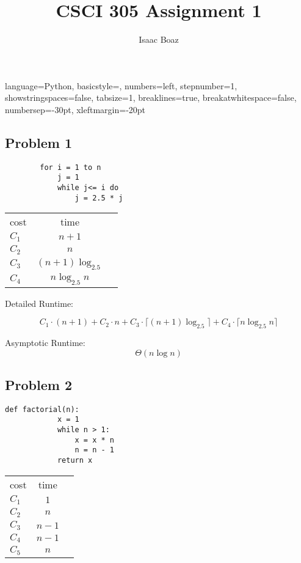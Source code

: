 \documentclass{article}
\title{CSCI 305 Assignment 1}
\author{Isaac Boaz}
\begin{document}
\maketitle

\lstset
{ %
    language=Python,
    basicstyle=\footnotesize,
    numbers=left,
    stepnumber=1,
    showstringspaces=false,
    tabsize=1,
    breaklines=true,
    breakatwhitespace=false,
    numbersep=-30pt,
    xleftmargin=-20pt
}
\setlength{\columnseprule}{0.1pt}

\subsection*{Problem 1}
\begin{multicols}{2}
    \begin{lstlisting}
        for i = 1 to n
            j = 1
            while j<= i do
                j = 2.5 * j
    \end{lstlisting}
    \columnbreak
    \footnotesize
    \begin{tabular}{lcc}
        cost  & time                 \\
        $C_1$ & $n + 1$              \\
        $C_2$ & $n$                  \\
        $C_3$ & $(n + 1) \log_{2.5}$ \\
        $C_4$ & $n \log_{2.5} n$
    \end{tabular}
\end{multicols}

Detailed Runtime:

\begin{equation*}
    C_1 \cdot (n + 1) + C_2 \cdot n + C_3 \cdot \lceil (n+1) \log_{2.5} \rceil + C_4 \cdot \lceil n \log_{2.5}n \rceil
\end{equation*}

Asymptotic Runtime:
\begin{equation*}
    \Theta(n \log n)
\end{equation*}

\subsection*{Problem 2}
\begin{multicols}{2}
    \begin{lstlisting}[firstnumber=0]
        def factorial(n):
            x = 1
            while n > 1:
                x = x * n
                n = n - 1
            return x
    \end{lstlisting}
    \columnbreak
    \footnotesize
    \begin{tabular}{lcc}
        cost  & time    \\
        $C_1$ & $1$     \\
        $C_2$ & $n$     \\
        $C_3$ & $n - 1$ \\
        $C_4$ & $n - 1$ \\
        $C_5$ & $n$     \\
    \end{tabular}
\end{multicols}
\end{document}
